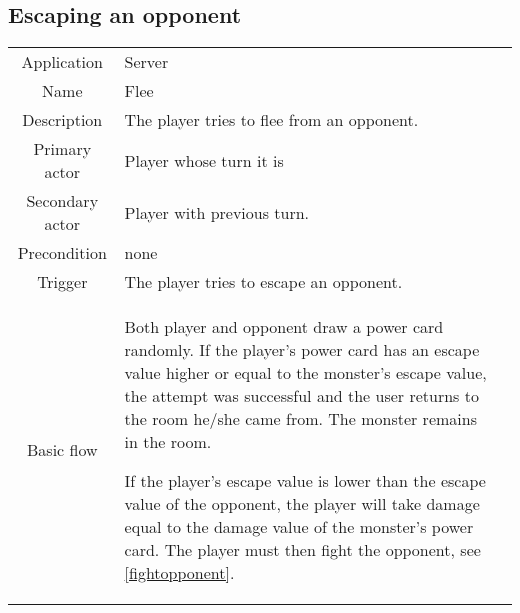 \subsection{Escaping an opponent}
\label{escape}
\begin{tabular}{|c| p{9cm}|c}
\hline
Application & Server \\
Name & Flee \\
Description & The player tries to flee from an opponent. \\
Primary actor & Player whose turn it is \\
Secondary actor & Player with previous turn. \\
Precondition & none \\
Trigger & The player tries to escape an opponent. \\ \hline
Basic flow & Both player and opponent draw a power card randomly. If the player's power card has an escape value higher or equal to the monster's escape value, the attempt was successful and the user returns to the room he/she came from. The monster remains in the room. 

If the player's escape value is lower than the escape value of the opponent, the player will take damage equal to the damage value of the monster's power card. The player must then fight the opponent, see \ref{fightopponent}.\\

\hline
\end{tabular}



